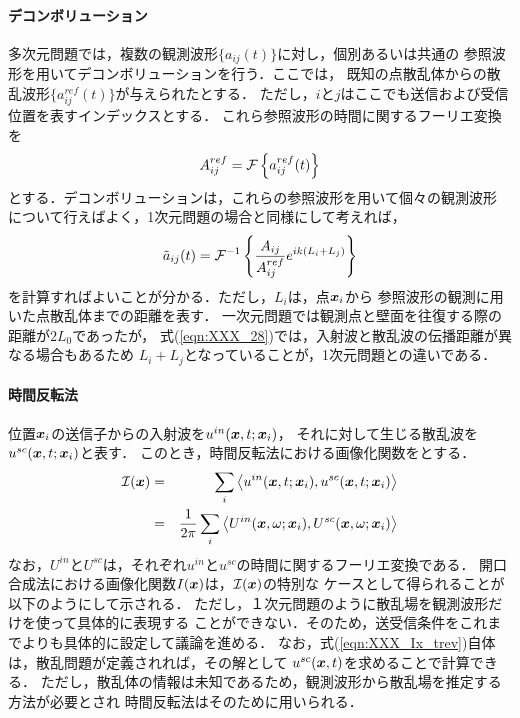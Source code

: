 \paragraph{デコンボリューション}
多次元問題では，複数の観測波形$\{ a_{ij}(t)\}$に対し，個別あるいは共通の
参照波形を用いてデコンボリューションを行う．ここでは，
既知の点散乱体からの散乱波形$\{a^{ref}_{ij}(t)\}$が与えられたとする．
ただし，$i$と$j$はここでも送信および受信位置を表すインデックスとする．
これら参照波形の時間に関するフーリエ変換を
\begin{equation}
	A_{ij}^{ref} ={\cal F} \left\{ a^{ref}_{ij}(t)\right\}
	\label{eqn:XXX_Aij0}
\end{equation}
とする．デコンボリューションは，これらの参照波形を用いて個々の観測波形
について行えばよく，1次元問題の場合と同様にして考えれば，
\begin{equation}
	\tilde a_{ij}(t) = {\cal F}^{-1} 
	\left\{
		\frac{A_{ij}}{A_{ij}^{ref}}e^{ik(L_i+L_j)}
	\right\}
	\label{eqn:XXX_28}
\end{equation}
を計算すればよいことが分かる．ただし，$L_i$は，点$\mbox{\boldmath $x$}_i$から
参照波形の観測に用いた点散乱体までの距離を表す．
一次元問題では観測点と壁面を往復する際の距離が$2L_0$であったが，
式(\ref{eqn:XXX_28})では，入射波と散乱波の伝播距離が異なる場合もあるため
$L_i+L_j$となっていることが，1次元問題との違いである．
%
\paragraph{時間反転法}
位置$\mbox{\boldmath $x$}_i$の送信子からの入射波を$u^{in}(\mbox{\boldmath $x$},t;\mbox{\boldmath $x$}_i)$，
それに対して生じる散乱波を$u^{sc}(\mbox{\boldmath $x$},t;\mbox{\boldmath $x$}_i)$と表す．
このとき，時間反転法における画像化関数をとする．
\begin{eqnarray}
	{\cal I}(\mbox{\boldmath $x$})
		&=&
	\sum_{i}
	\left<
		u^{in}(\mbox{\boldmath $x$},t;\mbox{\boldmath $x$}_i), u^{sc}(\mbox{\boldmath $x$},t;\mbox{\boldmath $x$}_i)
	\right>
	\\
	&=&
	\frac{1}{2\pi}
	\sum_{i}
	\left<
		U^{in}(\mbox{\boldmath $x$},\omega;\mbox{\boldmath $x$}_i), U^{sc}(\mbox{\boldmath $x$},\omega;\mbox{\boldmath $x$}_i)
	\right>
	\label{eqn:XXX_Ix_trev}
\end{eqnarray}
なお，$U^{in}$と$U^{sc}$は，それぞれ$u^{in}$と$u^{sc}$の時間に関するフーリエ変換である．
開口合成法における画像化関数$I(\mbox{\boldmath $x$})$は，${\cal I}(\mbox{\boldmath $x$})$の特別な
ケースとして得られることが以下のようにして示される．
ただし，１次元問題のように散乱場を観測波形だけを使って具体的に表現する
ことができない．そのため，送受信条件をこれまでよりも具体的に設定して議論を進める．
なお，式(\ref{eqn:XXX_Ix_trev})自体は，散乱問題が定義されれば，その解として
$u^{sc}(\mbox{\boldmath $x$},t)$を求めることで計算できる．
ただし，散乱体の情報は未知であるため，観測波形から散乱場を推定する方法が必要とされ
時間反転法はそのために用いられる．


